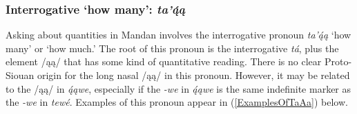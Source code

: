 \subsubsection{Interrogative `how many': \textit{ta'ą́ą}}\label{SubSubSecTaAa}

Asking about quantities in Mandan involves the interrogative pronoun \textit{ta'ą́ą} `how many' or `how much.' The root of this pronoun is the interrogative \textit{tá}, plus the element /ąą/ that has some kind of quantitative reading.  There is no clear Proto-Siouan origin for the long nasal /ąą/ in this pronoun. However, it may be related to the /ąą/ in \textit{ą́ąwe}, especially if the \textit{-we} in \textit{ą́ąwe} is the same indefinite marker as the \textit{-we} in \textit{tewé}. Examples of this pronoun appear in (\ref{ExamplesOfTaAa}) below.

\largerpage

